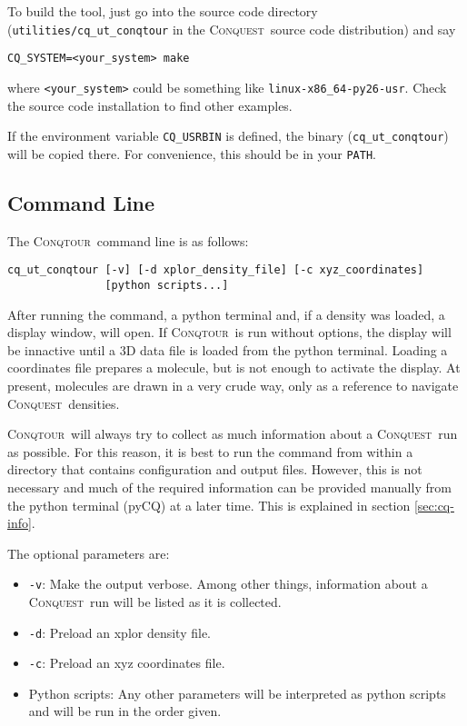 \documentclass[a4paper,notitlepage,11pt]{article}
\def\CQ{\textsc{Conquest}}
\def\Conqtour{\textsc{Conqtour}}
\begin{document}
To build the tool, just go into the source code directory 
(\texttt{utilities/cq\_ut\_conqtour} in the \CQ\ source code distribution) and say

\begin{verbatim}
CQ_SYSTEM=<your_system> make
\end{verbatim}

\noindent where \texttt{<your\_system>} could be something like \texttt{linux-x86\_64-py26-usr}.
Check the source code installation to find other examples.

If the environment variable \texttt{CQ\_USRBIN} is defined, 
the binary (\texttt{cq\_ut\_conqtour}) will be copied there. 
For convenience, this should be in your \texttt{PATH}.

\subsection{Command Line}
\label{sec:command}

The \Conqtour\ command line is as follows:

\begin{verbatim}
cq_ut_conqtour [-v] [-d xplor_density_file] [-c xyz_coordinates]
               [python scripts...]
\end{verbatim}

\noindent After running the command, a python terminal and, if a density was loaded, a display window, will open. 
If \Conqtour\ is run without options, the display will be innactive until a 3D data file is loaded from the python
terminal. Loading a coordinates file prepares a molecule, but is not enough to activate the display.
At present, molecules are drawn in a very crude way, only as a reference to navigate \CQ\ densities.

\Conqtour\ will always try to collect as much information about a \CQ\ run as possible. For this reason, 
it is best to run the command from within a directory that contains configuration and output files.
However, this is not necessary and much of the required information can be provided manually from the 
python terminal (pyCQ) at a later time. This is explained in section \ref{sec:cq-info}. 

The optional parameters are:

\begin{itemize}
\item \texttt{-v}: Make the output verbose. Among other things, information about a \CQ\ run will be listed as it is collected.
\item \texttt{-d}: Preload an xplor density file.
\item \texttt{-c}: Preload an xyz coordinates file.
\item Python scripts: Any other parameters will be interpreted as python scripts and will be run in the order given.
\end{itemize} 
\end{document}
